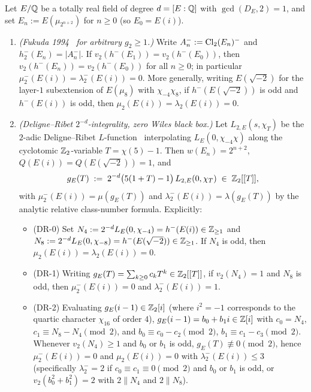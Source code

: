 \begin{theorem}\label{thm:4:fukuda-dr}
\tagProved{}
Let $E/\mathbb{Q}$ be a totally real field of degree $d = [E:\mathbb{Q}]$ with $\gcd(D_E, 2) = 1$, and set $E_n := E(\mu_{2^{n+2}})$ for $n \ge 0$ (so $E_0 = E(i)$).
\begin{enumerate}[label=\textup{(\roman*)}]
\item \emph{(Fukuda 1994~\cite{Fukuda1994} for arbitrary $g_2 \ge 1$.)} Write $A_n^- := \mathrm{Cl}_2(E_n)^-$ and $h_2^-(E_n) = |A_n^-|$. If $v_2(h^-(E_1)) = v_2(h^-(E_0))$, then $v_2(h^-(E_n)) = v_2(h^-(E_0))$ for all $n \ge 0$; in particular $\mu_2^-(E(i)) = \lambda_2^-(E(i)) = 0$. More generally, writing $E(\sqrt{-2})$ for the layer-$1$ subextension of $E(\mu_8)$ with $\chi_{-4}\chi_8$, if $h^-(E(\sqrt{-2}))$ is odd and $h^-(E(i))$ is odd, then $\mu_2(E(i)) = \lambda_2(E(i)) = 0$.
\item \emph{(Deligne--Ribet $2^{-d}$-integrality, zero Wiles black box.)} Let $L_{2, E}(s, \chi_T)$ be the $2$-adic Deligne--Ribet $L$-function~\cite{DR1980} interpolating $L_E(0, \chi_{-4}\chi)$ along the cyclotomic $\mathbb{Z}_2$-variable $T = \chi(5) - 1$. Then $w(E_n) = 2^{n+2}$, $Q(E(i)) = Q(E(\sqrt{-2})) = 1$, and
\begin{equation}\label{eq:4:gE}
  g_E(T) \;:=\; 2^{-d}\bigl(5(1+T) - 1\bigr)\, L_{2, E}(0, \chi_T) \;\in\; \mathbb{Z}_2[[T]],
\end{equation}
with $\mu_2^-(E(i)) = \mu(g_E(T))$ and $\lambda_2^-(E(i)) = \lambda(g_E(T))$ by the analytic relative class-number formula. Explicitly:
\begin{itemize}
\item \textup{(DR-0)} Set $N_4 := 2^{-d} L_E(0, \chi_{-4}) = h^-(E(i)) \in \mathbb{Z}_{\ge 1}$ and $N_8 := 2^{-d} L_E(0, \chi_{-8}) = h^-(E(\sqrt{-2})) \in \mathbb{Z}_{\ge 1}$. If $N_4$ is odd, then $\mu_2(E(i)) = \lambda_2(E(i)) = 0$.
\item \textup{(DR-1)} Writing $g_E(T) = \sum_{k \ge 0} c_k T^k \in \mathbb{Z}_2[[T]]$, if $v_2(N_4) = 1$ and $N_8$ is odd, then $\mu_2^-(E(i)) = 0$ and $\lambda_2^-(E(i)) = 1$.
\item \textup{(DR-2)} Evaluating $g_E(i-1) \in \mathbb{Z}_2[i]$ (where $i^2 = -1$ corresponds to the quartic character $\chi_{16}$ of order $4$), $g_E(i-1) = b_0 + b_1 i \in \mathbb{Z}[i]$ with $c_0 = N_4$, $c_1 \equiv N_8 - N_4 \pmod{2}$, and $b_0 \equiv c_0 - c_2 \pmod{2}$, $b_1 \equiv c_1 - c_3 \pmod{2}$. Whenever $v_2(N_4) \ge 1$ and $b_0$ or $b_1$ is odd, $g_E(T) \not\equiv 0 \pmod{2}$, hence $\mu_2^-(E(i)) = 0$ and $\mu_2(E(i)) = 0$ with $\lambda_2^-(E(i)) \le 3$ (specifically $\lambda_2^- = 2$ if $c_0 \equiv c_1 \equiv 0 \pmod 2$ and $b_0$ or $b_1$ is odd, or $v_2(b_0^2 + b_1^2) = 2$ with $2 \parallel N_4$ and $2 \parallel N_8$).
\end{itemize}
\end{enumerate}
\end{theorem}
